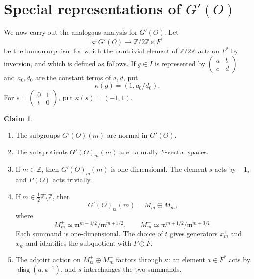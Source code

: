 \documentclass[11pt,a4paper,twoside]{amsart}
\theoremstyle{definition}
\newtheorem{claim}[theorem]{Claim}
\theoremstyle{remark}
\newcommand{\kk}{\kappa}
\newcommand{\ZZ}{\mathbb Z}
\newcommand{\fm}{\mathfrak m}
\newcommand{\sm}{\setminus}
\begin{document}
\section{Special representations of $G'(O)$}\label{G'O}
We now carry out the analogous analysis for $G'(O)$. Let
$$
\kk:G'(O)\longrightarrow\ZZ/2\ZZ\ltimes F^*
$$
be the homomorphism for which the nontrivial element of $\ZZ/2\ZZ$ acts on $F^*$ by inversion, and which is defined as follows. If $g\in I$ is represented by $\begin{pmatrix}a&b\\c&d\end{pmatrix}$ and $a_0,d_0$ are the constant terms of $a,d$, put
$$
\kk(g)=(1,a_0/d_0).
$$
For $s=\begin{pmatrix}0&1\\t&0\end{pmatrix}$, put $\kk(s)=(-1,1)$.
\begin{claim}\label{act}
\begin{enumerate}
\item The subgroups $G'(O)(m)$ are normal in $G'(O)$.
\item The subquotients $G'(O)_m(m)$ are naturally $F$-vector spaces.
\item If $m\in\ZZ$, then $G'(O)_m(m)$ is one-dimensional. The element $s$ acts by $-1$, and $P(O)$ acts trivially.
\item If $m\in\frac12\ZZ\sm\ZZ$, then
$$
G'(O)_m(m)=M_m^+\oplus M_m^-,
$$
where
$$
M_m^+\simeq\fm^{m-1/2}/\fm^{m+1/2},
\qquad
M_m^-\simeq\fm^{m+1/2}/\fm^{m+3/2}.
$$
Each summand is one-dimensional. The choice of $t$ gives generators $x_m^+$ and $x_m^-$ and identifies the subquotient with $F\oplus F$.
\item The adjoint action on $M_m^+\oplus M_m^-$ factors through $\kk$: an element $a\in F^*$ acts by $\operatorname{diag}(a,a^{-1})$, and $s$ interchanges the two summands.
\end{enumerate}
\end{claim}
\end{document}
